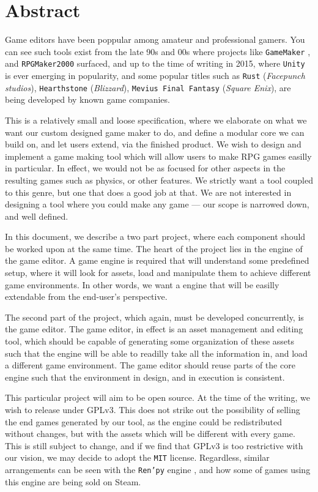 \section{Abstract}

Game editors have been poppular among amateur and professional gamers. You can
see such tools exist from the late 90s and 00s where projects like
\texttt{GameMaker} \cite{gamemaker}, and \texttt{RPGMaker2000}
\cite{rpgmaker2000} surfaced, and up to the time of writing in 2015, where
\texttt{Unity} is ever emerging in popularity, and some popular titles such as
\texttt{Rust} (\textit{Facepunch studios}), \texttt{Hearthstone}
(\textit{Blizzard}), \texttt{Mevius Final Fantasy} (\textit{Square Enix}), are being
developed by known game companies.

This is a relatively small and loose specification, where we elaborate on what
we want our custom designed game maker to do, and define a modular core we can
build on, and let users extend, via the finished product. We wish to design and
implement a game making tool which will allow users to make RPG games easilly in
particular. In effect, we would not be as focused for other aspects in the
resulting games such as physics, or other features. We strictly want a tool
coupled to this genre, but one that does a good job at that. We are not
interested in designing a tool where you could make any game --- our scope is
narrowed down, and well defined.

In this document, we describe a two part project, where each component should be
worked upon at the same time. The heart of the project lies in the engine of the
game editor. A game engine is required that will understand some predefined
setup, where it will look for assets, load and manipulate them to achieve
different game environments. In other words, we want a engine that will be
easilly extendable from the end-user's perspective.

The second part of the project, which again, must be developed concurrently, is
the game editor. The game editor, in effect is an asset management and editing
tool, which should be capable of generating some organization of these assets
such that the engine will be able to readilly take all the information in, and
load a different game environment. The game editor should reuse parts of the
core engine such that the environment in design, and in execution is consistent.

This particular project will aim to be open source. At the time of the writing,
we wish to release under GPLv3. This does not strike out the possibility of
selling the end games generated by our tool, as the engine could be
redistributed without changes, but with the assets which will be different with
every game. This is still subject to change, and if we find that GPLv3 is too
restrictive with our vision, we may decide to adopt the \texttt{MIT} license.
Regardless, similar arrangements can be seen with the \texttt{Ren'py} engine
\cite{renpy}, and how some of games using this engine are being sold on Steam.

